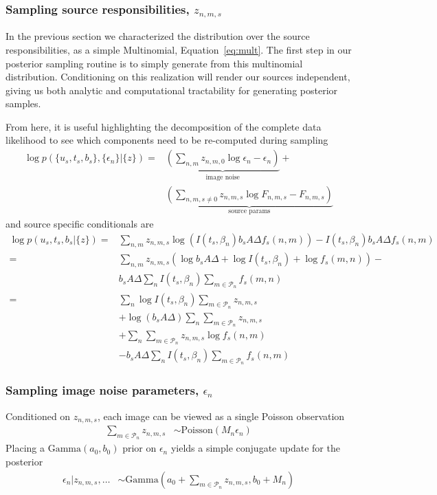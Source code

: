\documentclass[11pt]{article}
\begin{document}
\subsubsection{Sampling source responsibilities, $z_{n,m,s}$}
In the previous section we characterized the distribution over the source responsibilities, as a simple Multinomial, Equation~\ref{eq:mult}. The first step in our posterior sampling routine is to simply generate from this multinomial distribution. Conditioning on this realization will render our sources independent, giving us both analytic and computational tractability for generating posterior samples.  

From here, it is useful highlighting the decomposition of the complete data likelihood to see which components need to be re-computed during sampling 
\begin{align}
  \log p( \{u_s, t_s, b_s\}, \{ \epsilon_n\} | \{ z \})
  =& \underbrace{\left( \sum_{n,m} z_{n,m,0} \log \epsilon_n - \epsilon_n \right)}_{\text{image noise}} + \\
     & \underbrace{\left(\sum_{n,m,s\neq 0} z_{n,m,s} \log F_{n,m,s} - F_{n,m,s}\right)}_{\text{source params}} 
\end{align}
and source specific conditionals are
\begin{align}
\log p(u_s, t_s, b_s | \{z\}) 
  =& \sum_{n,m} z_{n,m,s} \log\left(I(t_s,\beta_n) b_s A \Delta f_s(n,m) \right) - I(t_s,\beta_n) b_s A \Delta f_s(n,m)\\
  =& \sum_{n,m} z_{n,m,s} \left(\log b_s A \Delta + \log I(t_s, \beta_n) + \log f_s(m,n) \right) - \\
   & b_s A \Delta \sum_{n} I(t_s, \beta_n) \sum_{m \in \mathcal{P}_n} f_s(m,n) \\
  =& \sum_{n} \log I(t_s, \beta_n) \sum_{m \in \mathcal{P}_n} z_{n,m,s} \\
   & + \log (b_s A \Delta) \sum_{n} \sum_{m \in \mathcal{P}_n} z_{n,m,s} \\
   & + \sum_{n} \sum_{m \in \mathcal{P}_n} z_{n,m,s} \log f_s(n,m) \\
   & - b_s A \Delta \sum_{n} I(t_s, \beta_n) \sum_{m \in \mathcal{P}_n} f_s(n,m)
\end{align}


\subsubsection{Sampling image noise parameters, $\epsilon_n$}
Conditioned on $z_{n,m,s}$, each image can be viewed as a single Poisson observation
\begin{align}
  \sum_{m \in \mathcal{P}_n} z_{n,m,s} &\sim \textrm{Poisson}(M_n \epsilon_n)
\end{align}
Placing a $\textrm{Gamma}(a_0, b_0)$ prior on $\epsilon_n$ yields a simple conjugate update for the posterior 
\begin{align}
  \epsilon_n | z_{n,m,s}, \dots &\sim \textrm{Gamma}\left(a_0 + \sum_{m\in \mathcal{P}_n} z_{n,m,s}, b_0 + M_n \right)
\end{align}
 
\end{document}
